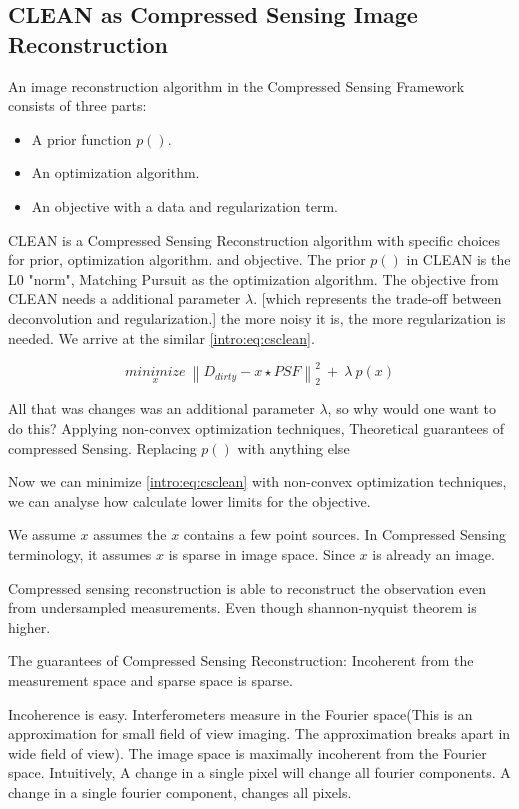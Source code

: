\subsection{CLEAN as Compressed Sensing Image Reconstruction}
An image reconstruction algorithm in the Compressed Sensing Framework consists of three parts:

\begin{itemize}
	\item A prior function $p()$.
	\item An optimization algorithm.
	\item An objective with a data and regularization term.
\end{itemize}

CLEAN is a Compressed Sensing Reconstruction algorithm with specific choices for prior, optimization algorithm. and objective. The prior $p()$ in CLEAN is the L0 "norm", Matching Pursuit as the optimization algorithm. The objective from CLEAN needs a additional parameter $\lambda$.  [which represents the trade-off between deconvolution and regularization.] the more noisy it is, the more regularization is needed. We arrive at the similar \eqref{intro:eq:csclean}.

\begin{equation}\label{intro:eq:csclean}
\underset{x}{minimize} \: \left \| D_{dirty} - x \star PSF \right \|_2^2 \: + \: \lambda \: p(x) 
\end{equation}

All that was changes was an additional parameter $\lambda$, so why would one want to do this? 
Applying non-convex optimization techniques,
Theoretical guarantees of compressed Sensing.
Replacing $p()$ with anything else

Now we can minimize \eqref{intro:eq:csclean} with non-convex optimization techniques, we can analyse how calculate lower limits for the objective.


We assume $x$ assumes the $x$ contains a few point sources. In Compressed Sensing terminology, it assumes $x$ is sparse in image space. Since $x$ is already an image.


Compressed sensing reconstruction is able to reconstruct the observation even from undersampled measurements. Even though shannon-nyquist theorem is higher.

The guarantees of Compressed Sensing Reconstruction: Incoherent from the measurement space and sparse space is sparse.

Incoherence is easy. Interferometers measure in the Fourier space(This is an approximation for small field of view imaging. The approximation breaks apart in wide field of view). The image space is maximally incoherent from the Fourier space. Intuitively, A change in a single pixel will change all fourier components. A change in a single fourier component, changes all pixels.

